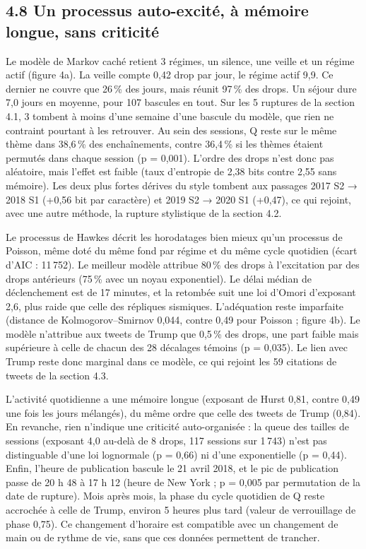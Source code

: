 \documentclass[11pt,a4paper]{article}
\begin{document}
\subsection*{4.8 Un processus auto-excité, à mémoire longue, sans criticité}

Le modèle de Markov caché retient 3 régimes, un silence, une veille et un régime actif (figure 4a). La veille compte 0,42 drop par jour, le régime actif 9,9. Ce dernier ne couvre que 26 \% des jours, mais réunit 97 \% des drops. Un séjour dure 7,0 jours en moyenne, pour 107 bascules en tout. Sur les 5 ruptures de la section 4.1, 3 tombent à moins d'une semaine d'une bascule du modèle, que rien ne contraint pourtant à les retrouver. Au sein des sessions, Q reste sur le même thème dans 38,6 \% des enchaînements, contre 36,4 \% si les thèmes étaient permutés dans chaque session (p = 0,001). L'ordre des drops n'est donc pas aléatoire, mais l'effet est faible (taux d'entropie de 2,38 bits contre 2,55 sans mémoire). Les deux plus fortes dérives du style tombent aux passages 2017 S2 → 2018 S1 (+0,56 bit par caractère) et 2019 S2 → 2020 S1 (+0,47), ce qui rejoint, avec une autre méthode, la rupture stylistique de la section 4.2.

Le processus de Hawkes décrit les horodatages bien mieux qu'un processus de Poisson, même doté du même fond par régime et du même cycle quotidien (écart d'AIC : 11 752). Le meilleur modèle attribue 80 \% des drops à l'excitation par des drops antérieurs (75 \% avec un noyau exponentiel). Le délai médian de déclenchement est de 17 minutes, et la retombée suit une loi d'Omori d'exposant 2,6, plus raide que celle des répliques sismiques. L'adéquation reste imparfaite (distance de Kolmogorov–Smirnov 0,044, contre 0,49 pour Poisson ; figure 4b). Le modèle n'attribue aux tweets de Trump que 0,5 \% des drops, une part faible mais supérieure à celle de chacun des 28 décalages témoins (p = 0,035). Le lien avec Trump reste donc marginal dans ce modèle, ce qui rejoint les 59 citations de tweets de la section 4.3.

L'activité quotidienne a une mémoire longue (exposant de Hurst 0,81, contre 0,49 une fois les jours mélangés), du même ordre que celle des tweets de Trump (0,84). En revanche, rien n'indique une criticité auto-organisée : la queue des tailles de sessions (exposant 4,0 au-delà de 8 drops, 117 sessions sur 1 743) n'est pas distinguable d'une loi lognormale (p = 0,66) ni d'une exponentielle (p = 0,44). Enfin, l'heure de publication bascule le 21 avril 2018, et le pic de publication passe de 20 h 48 à 17 h 12 (heure de New York ; p = 0,005 par permutation de la date de rupture). Mois après mois, la phase du cycle quotidien de Q reste accrochée à celle de Trump, environ 5 heures plus tard (valeur de verrouillage de phase 0,75). Ce changement d'horaire est compatible avec un changement de main ou de rythme de vie, sans que ces données permettent de trancher.
\end{document}
